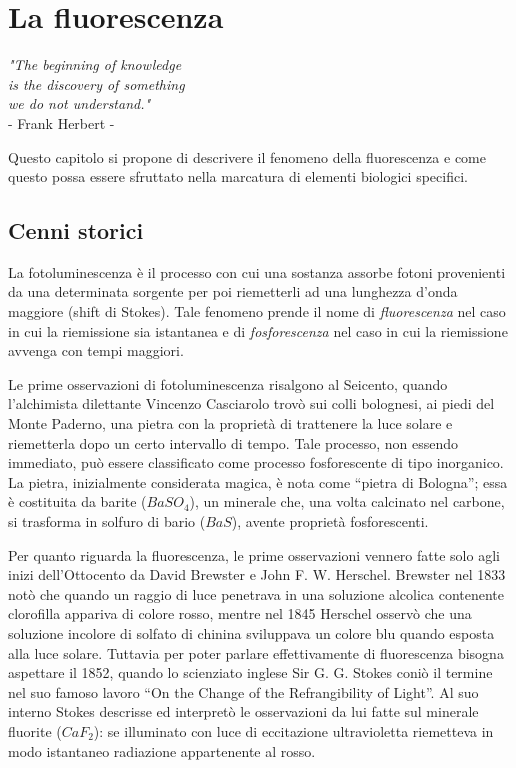 \clearpage{\pagestyle{empty}\cleardoublepage}

\chapter{La fluorescenza}

\begin{flushright}\begin{small}\textit{"The beginning of knowledge\\
 is the discovery of something\\ we do not understand."}\\
- Frank Herbert -\\
\end{small}\end{flushright}

Questo capitolo si propone di descrivere il fenomeno della fluorescenza e come questo possa essere sfruttato nella marcatura di elementi biologici specifici.


\section{Cenni storici}


La fotoluminescenza è il processo con cui una sostanza assorbe fotoni provenienti da una determinata sorgente per poi riemetterli ad una lunghezza d'onda maggiore (shift di Stokes). 
Tale fenomeno prende il nome di \textit{fluorescenza} nel caso in cui la riemissione sia istantanea e di \textit{fosforescenza} nel caso in cui la riemissione avvenga con tempi maggiori. 

Le prime osservazioni di fotoluminescenza risalgono al Seicento, quando l'alchimista dilettante Vincenzo Casciarolo trovò sui colli bolognesi, ai piedi del Monte Paderno, una pietra con la proprietà di trattenere la luce solare e riemetterla dopo un certo intervallo di tempo. 
Tale processo, non essendo immediato, può essere classificato come processo fosforescente di tipo inorganico. 
La pietra, inizialmente considerata magica, è nota come ``pietra di Bologna''; essa è costituita da barite ($BaSO_4$), un minerale che, una volta calcinato nel carbone, si trasforma in solfuro di bario ($BaS$), avente proprietà fosforescenti. 

Per quanto riguarda la fluorescenza, le prime osservazioni vennero fatte solo agli inizi dell'Ottocento da David Brewster e John F. W. Herschel. Brewster nel 1833 notò che quando un raggio di luce penetrava in una soluzione alcolica contenente clorofilla appariva di colore rosso, mentre nel 1845 Herschel osservò che una soluzione incolore di solfato di chinina sviluppava un colore blu quando esposta alla luce solare. 
Tuttavia per poter parlare effettivamente di fluorescenza bisogna aspettare il 1852, quando lo scienziato inglese Sir G. G. Stokes coniò il termine nel suo famoso lavoro ``On the Change of the Refrangibility of Light''. 
Al suo interno Stokes descrisse ed interpretò le osservazioni da lui fatte sul minerale fluorite ($CaF_2$): se illuminato con luce di eccitazione ultravioletta riemetteva in modo istantaneo radiazione appartenente al rosso. 

